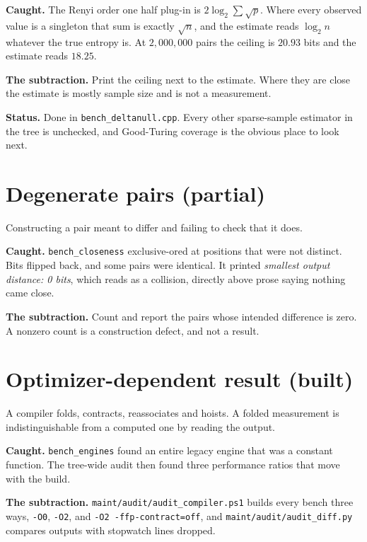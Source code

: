 \textbf{Caught.} The Renyi order one half plug-in is \(2 \log_2 \sum \sqrt{p}\). Where every observed value is a singleton that sum is exactly \(\sqrt{n}\), and the estimate reads \(\log_2 n\) whatever the true entropy is. At \(2{,}000{,}000\) pairs the ceiling is \(20.93\) bits and the estimate reads \(18.25\).

\textbf{The subtraction.} Print the ceiling next to the estimate. Where they are close the estimate is mostly sample size and is not a measurement.

\textbf{Status.} Done in \texttt{bench\_deltanull.cpp}. Every other sparse-sample estimator in the tree is unchecked, and Good-Turing coverage is the obvious place to look next.

\section{Degenerate pairs (partial)}

Constructing a pair meant to differ and failing to check that it does.

\textbf{Caught.} \texttt{bench\_closeness} exclusive-ored at positions that were not distinct. Bits flipped back, and some pairs were identical. It printed \emph{smallest output distance: 0 bits}, which reads as a collision, directly above prose saying nothing came close.

\textbf{The subtraction.} Count and report the pairs whose intended difference is zero. A nonzero count is a construction defect, and not a result.

\section{Optimizer-dependent result (built)}

A compiler folds, contracts, reassociates and hoists. A folded measurement is indistinguishable from a computed one by reading the output.

\textbf{Caught.} \texttt{bench\_engines} found an entire legacy engine that was a constant function. The tree-wide audit then found three performance ratios that move with the build.

\textbf{The subtraction.} \texttt{maint/\allowbreak{}audit/\allowbreak{}audit\_compiler.ps1} builds every bench three ways, \texttt{-O0}, \texttt{-O2}, and \texttt{-O2 -ffp-contract=off}, and \texttt{maint/\allowbreak{}audit/\allowbreak{}audit\_diff.py} compares outputs with stopwatch lines dropped.

